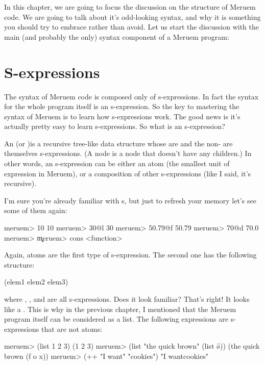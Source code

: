 In this chapter, we are going to focus the discussion on the structure of Meruem code. We are going to talk about it's odd-looking syntax, and why it is something you should try to embrace rather than avoid. Let us start the discussion with the main (and probably the only) syntax component of a Meruem program: 

\section{S-expressions}
The syntax of Meruem code is composed only of s-expressions. In fact the syntax for the whole program itself is an s-expression. So the key to mastering the syntax of Meruem is to learn how s-expressions work. The good news is it's actually pretty easy to learn s-expressions. So what is an s-expression?

An  (or )is a recursive tree-like data structure whose  are  and the non- are themselves s-expressions. 
(A  node is a node that doesn't have any children.) In other words, an s-expression can be either an atom (the smallest unit of expression in Meruem), or a composition of other s-expressions (like I said, it's recursive). 

I'm sure you're already familiar with s, but just to refresh your memory let's see some of them again:

\begin{REPL}
meruem> 10            
10
meruem> 30@l
30
meruem> 50.79@f
50.79
meruem> 70@d
70.0
meruem> \c
\c
meruem> cons
<function>
\end{REPL}

Again, atoms are the first type of s-expression. The second one has the following structure: 

\begin{QuasiLang}
(elem1 elem2 elem3)
\end{QuasiLang}

where , , and  are all s-expressions. Does it look familiar? That's right! It looks like a . This is why in the previous chapter, I mentioned that the Meruem program itself can be considered as a list. The following expressions are s-expressions that are not atoms:

\begin{REPL}
meruem> (list 1 2 3)
(1 2 3)
meruem> (list "the quick brown" (list \f \o \x))
(the quick brown (f o x))
meruem> (++ "I want" "cookies")
"I wantcookies"
\end{REPL}

